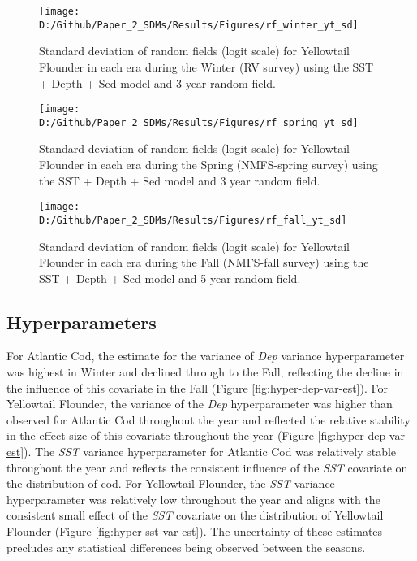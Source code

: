\documentclass[
]{article}
\begin{document}
\begin{landscape}
\newpage
\begin{figure}[htb]

{\centering \texttt{[image: D:/Github/Paper\_2\_SDMs/Results/Figures/rf\_winter\_yt\_sd]} 

}

\caption{Standard deviation of random fields (logit scale) for Yellowtail Flounder in each era during the Winter (RV survey) using the SST + Depth + Sed model and 3 year random field.}\label{fig:rf-winter-yt-sd}
\end{figure}

\newpage
\begin{figure}[htb]

{\centering \texttt{[image: D:/Github/Paper\_2\_SDMs/Results/Figures/rf\_spring\_yt\_sd]} 

}

\caption{Standard deviation of random fields (logit scale) for Yellowtail Flounder in each era during the Spring (NMFS-spring survey) using the SST + Depth + Sed model and 3 year random field.}\label{fig:rf-spring-yt-sd}
\end{figure}

\newpage
\begin{figure}[htb]

{\centering \texttt{[image: D:/Github/Paper\_2\_SDMs/Results/Figures/rf\_fall\_yt\_sd]} 

}

\caption{Standard deviation of random fields (logit scale) for Yellowtail Flounder in each era during the Fall (NMFS-fall survey) using the SST + Depth + Sed model and 5 year random field.}\label{fig:rf-fall-yt-sd}
\end{figure}
\end{landscape}

\hypertarget{hyperparameters}{%
\subsection{Hyperparameters}\label{hyperparameters}}

For Atlantic Cod, the estimate for the variance of \emph{Dep} variance hyperparameter was highest in Winter and declined through to the Fall, reflecting the decline in the influence of this covariate in the Fall (Figure \ref{fig:hyper-dep-var-est}). For Yellowtail Flounder, the variance of the \emph{Dep} hyperparameter was higher than observed for Atlantic Cod throughout the year and reflected the relative stability in the effect size of this covariate throughout the year (Figure \ref{fig:hyper-dep-var-est}). The \emph{SST} variance hyperparameter for Atlantic Cod was relatively stable throughout the year and reflects the consistent influence of the \emph{SST} covariate on the distribution of cod. For Yellowtail Flounder, the \emph{SST} variance hyperparameter was relatively low throughout the year and aligns with the consistent small effect of the \emph{SST} covariate on the distribution of Yellowtail Flounder (Figure \ref{fig:hyper-sst-var-est}). The uncertainty of these estimates precludes any statistical differences being observed between the seasons.
\end{document}
